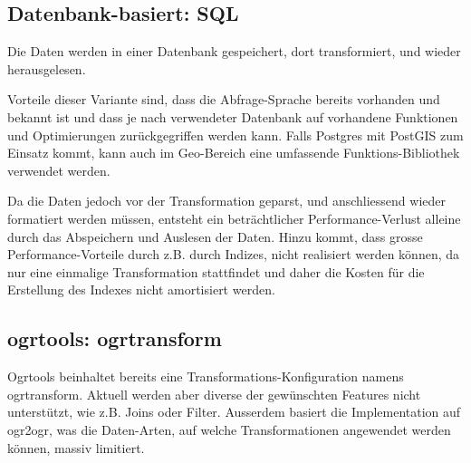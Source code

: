 
\subsection{Datenbank-basiert: SQL}
Die Daten werden in einer Datenbank gespeichert, dort transformiert, und wieder herausgelesen.

Vorteile dieser Variante sind, dass die Abfrage-Sprache bereits vorhanden und bekannt ist und dass je nach verwendeter Datenbank auf vorhandene Funktionen und Optimierungen zurückgegriffen werden kann. Falls Postgres mit PostGIS zum Einsatz kommt, kann auch im Geo-Bereich eine umfassende Funktions-Bibliothek verwendet werden. 

Da die Daten jedoch vor der Transformation geparst, und anschliessend wieder formatiert werden müssen, entsteht ein beträchtlicher Performance-Verlust alleine durch das Abspeichern und Auslesen der Daten. Hinzu kommt, dass grosse Performance-Vorteile durch z.B. durch Indizes, nicht realisiert werden können, da nur eine einmalige Transformation stattfindet und daher die Kosten für die Erstellung des Indexes nicht amortisiert werden.

\subsection{ogrtools: ogrtransform}
Ogrtools beinhaltet bereits eine Transformations-Konfiguration namens ogrtransform. Aktuell werden aber diverse der gewünschten Features nicht unterstützt, wie z.B. Joins oder Filter. Ausserdem basiert die Implementation auf ogr2ogr, was die Daten-Arten, auf welche Transformationen angewendet werden können, massiv limitiert.


